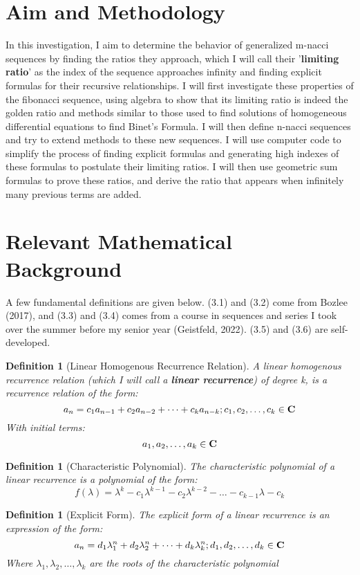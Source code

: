 \documentclass[11pt]{article}
\newtheorem{definition}[theorem]{Definition}
\begin{document}
\section{Aim and Methodology}

In this investigation, I aim to determine the behavior of generalized m-nacci sequences by finding the ratios they approach, which I will call their '\textbf{limiting ratio}’ as the index of the sequence approaches infinity and finding explicit formulas for their recursive relationships. I will first investigate these properties of the fibonacci sequence, using algebra to show that its limiting ratio is indeed the golden ratio and methods similar to those used to find solutions of homogeneous differential equations to find Binet’s Formula. I will then define n-nacci sequences and try to extend methods to these new sequences. I will use computer code to simplify the process of finding explicit formulas and generating high indexes of these formulas to postulate their limiting ratios. I will then use geometric sum formulas to prove these ratios, and derive the ratio that appears when infinitely many previous terms are added. 


\section{Relevant Mathematical Background}
A few fundamental definitions are given below. (3.1) and (3.2) come from Bozlee (2017), and (3.3) and (3.4) comes from a course in sequences and series I took over the summer before my senior year (Geistfeld, 2022). (3.5) and (3.6) are self-developed.

\begin{definition}[Linear Homogenous Recurrence Relation] A linear homogenous recurrence relation (which I will call a \textbf{linear recurrence}) of degree \mbox{k}, is a recurrence relation of the form:
    $$a_n=c_1a_{n-1}+c_2a_{n-2}+\dots +c_ka_{n-k}; c_1,c_2,\dots,c_k\in \mbox{\textbf{C}}$$ 
    With initial terms: 
    $$a_1,a_2,\dots,a_k\in\mbox{\textbf{C}}$$
\end{definition}

\begin{definition}[Characteristic Polynomial] The characteristic polynomial of a linear recurrence is a polynomial of the form:
    $$f(\lambda) = \lambda^{k}-c_1\lambda^{k-1}-c_2\lambda^{k-2}-\dots-c_{k-1}\lambda-c_k$$ 
\end{definition}

\begin{definition}[Explicit Form] The explicit form of a linear recurrence is an expression of the form:
    $$a_n=d_1\lambda_1^n+d_2\lambda_2^n+\dots+d_k\lambda_k^n; d_1,d_2,\dots,d_k \in\mbox{\textbf{C}}$$ 
    Where \mbox{$\lambda_1,\lambda_2,\dots,\lambda_k$} are the roots of the characteristic polynomial
\end{definition}
\end{document}
